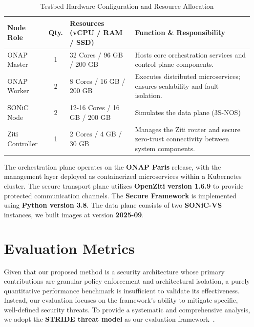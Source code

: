 \documentclass[12pt, a4paper, reqno, oneside]{book}
\begin{document}
\begin{table}[t]
\centering
\small
\caption{Testbed Hardware Configuration and Resource Allocation}
\label{tab:hardware_specs}
\begin{tabular}{p{2.4cm} c p{5cm} p{7.5cm}}
\toprule
\textbf{Node Role} & \textbf{Qty.} & \textbf{Resources (vCPU / RAM / SSD)} & \textbf{Function \& Responsibility} \\ \midrule
ONAP Master & 1 & 32 Cores / 96 GB / 200 GB & Hosts core orchestration services and control plane components. \\ \addlinespace
ONAP Worker & 2 & 8 Cores / 16 GB / 200 GB & Executes distributed microservices; ensures scalability and fault isolation. \\ \addlinespace
SONiC Node & 2 & 12-16 Cores / 16 GB / 200 GB & Simulates the data plane (3S-NOS) \\

\addlinespace
Ziti Controller & 1 & 2 Cores / 4 GB / 30 GB & Manages the Ziti router and secure zero-trust connectivity between system components. \\ \bottomrule
\end{tabular}
\end{table}


The orchestration plane operates on the \textbf{ONAP Paris} release, with the management layer deployed as containerized microservices within a Kubernetes cluster. The secure transport plane utilizes \textbf{OpenZiti version 1.6.9} to provide protected communication channels. The \textbf{Secure Framework} is implemented using \textbf{Python version 3.8}. The data plane consists of two \textbf{SONiC-VS} instances, we built images at version \textbf{2025-09}.



\section{Evaluation Metrics}
\label{sec:evaluation_metrics}
Given that our proposed method is a security architecture whose primary contributions are granular policy enforcement and architectural isolation, a purely quantitative performance benchmark is insufficient to validate its effectiveness. Instead, our evaluation focuses on the framework's ability to mitigate specific, well-defined security threats. To provide a systematic and comprehensive analysis, we adopt the \textbf{STRIDE threat model} as our evaluation framework~\cite{Khan2017stride, ruffy2016stride}.
\end{document}
